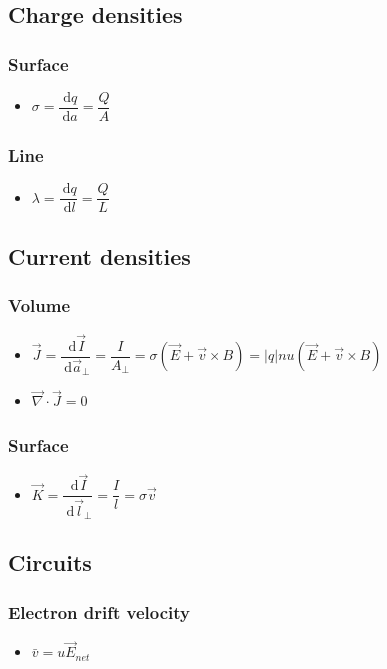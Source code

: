 \documentclass[]{report}
\newcommand \tab[1][1cm]{\hspace*{#1}}
\newcommand{\dn}[1]{\ \mathrm{d}#1}
\newcommand{\dd}[2]{ \dfrac{\dn #1}{\dn #2}}
\newcommand{\itemt}{\item \tab}
\begin{document}
		\subsection{Charge densities}
        
\subsubsection{Surface}
\begin{itemize}
\itemt \( \sigma = \dd{q}{a} = \dfrac{Q}{A} \)
\end{itemize}
\subsubsection{Line}
\begin{itemize}
\itemt \( \lambda = \dd{q}{l} = \dfrac{Q}{L} \) 
\end{itemize}

		\subsection{Current densities}
        
\subsubsection{Volume}
\begin{itemize}
\itemt \( \vec{J} = \dd{\vec{I}}{\vec{a}_\perp} = \dfrac{I}{A_\perp} = \sigma(\vec{E}+\vec{v}\times B) = |q|nu (\vec{E}+\vec{v}\times B)\)
\itemt \( \vec{\nabla} \cdot \vec{J} = 0 \)
\end{itemize}

\subsubsection{Surface}
\begin{itemize}
\itemt \( \vec{K} = \dd{\vec{I}}{\vec{l}_\perp} = \dfrac{I}{l} = \sigma \vec{v}\)
\end{itemize}




		\subsection{Circuits}

\subsubsection{Electron drift velocity}
\begin{itemize}
\itemt \( \bar{v} = u\vec{E}_{net} \)
\end{itemize}	
\end{document}
